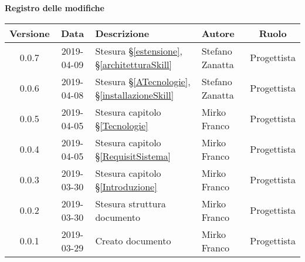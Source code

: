 	\begin{center}
		\textbf{Registro delle modifiche}
	\end{center}
	\begin{center}
		\begin{tabularx}{\textwidth}{|c|c|X|X|c|}
			\hline
			\textbf{Versione} & \textbf{Data} & \textbf{Descrizione} & \textbf{Autore} & \textbf{Ruolo} \\		
			\hline
			0.0.7 & 2019-04-09 & Stesura \S\ref{estensione}, \S\ref{architetturaSkill} & Stefano Zanatta & Progettista \\
			\hline
			0.0.6 & 2019-04-08 & Stesura \S\ref{ATecnologie}, \S\ref{installazioneSkill} & Stefano Zanatta & Progettista \\
			\hline
			0.0.5 & 2019-04-05 & Stesura capitolo \S\ref{Tecnologie} & Mirko Franco & Progettista \\
			\hline
			0.0.4 & 2019-04-05 & Stesura capitolo \S\ref{RequisitSistema} & Mirko Franco & Progettista \\
			\hline
			0.0.3 & 2019-03-30 & Stesura capitolo \S\ref{Introduzione} & Mirko Franco & Progettista \\
			\hline
			0.0.2 & 2019-03-30 & Stesura struttura documento & Mirko Franco & Progettista \\
			\hline
			0.0.1 & 2019-03-29 & Creato documento & Mirko Franco & Progettista \\
			\hline
		\end{tabularx}
	\end{center}
\newpage